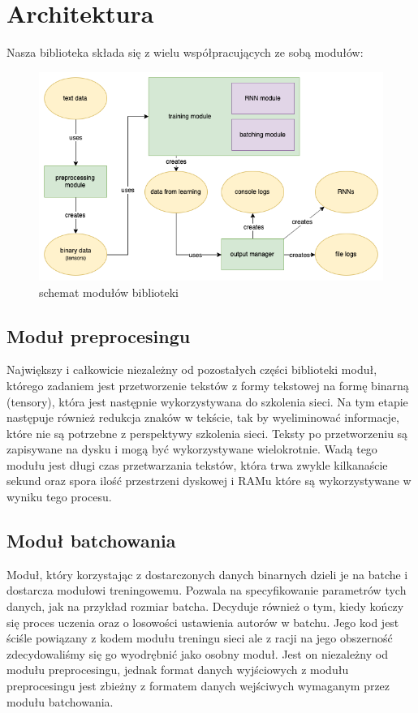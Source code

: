 \newpage
\section{Architektura}
Nasza biblioteka składa się z wielu współpracujących ze sobą modułów:
\begin{figure}[!ht]
\includegraphics[width=\linewidth]{./images/modules.png}
\caption{schemat modułów biblioteki}
\label{fig:test3}
\end{figure}

\subsection{Moduł preprocesingu}
Największy i całkowicie niezależny od pozostałych części biblioteki moduł, którego zadaniem jest 
przetworzenie tekstów z formy tekstowej na formę binarną (tensory), która jest następnie wykorzystywana
do szkolenia sieci. Na tym etapie następuje również redukcja znaków w tekście, tak by wyeliminować
informacje, które nie są potrzebne z perspektywy szkolenia sieci. Teksty po przetworzeniu są 
zapisywane na dysku i mogą być wykorzystywane wielokrotnie. 
Wadą tego modułu jest długi czas przetwarzania tekstów, która trwa zwykle kilkanaście sekund oraz spora ilość
przestrzeni dyskowej i RAMu które są wykorzystywane w wyniku tego procesu.

\subsection{Moduł batchowania}
Moduł, który korzystając z dostarczonych danych binarnych dzieli je na batche i dostarcza modułowi treningowemu.
Pozwala na specyfikowanie parametrów tych danych, jak na przykład rozmiar batcha.
Decyduje również o tym, kiedy kończy się proces uczenia oraz o losowości ustawienia autorów w batchu. 
Jego kod jest ściśle powiązany z kodem modułu treningu sieci ale z racji na jego obszerność zdecydowaliśmy 
się go wyodrębnić jako osobny moduł. 
Jest on niezależny od modułu preprocesingu, jednak format danych wyjściowych z modułu preprocesingu 
jest zbieżny z formatem danych wejściwych wymaganym przez modułu batchowania. 

